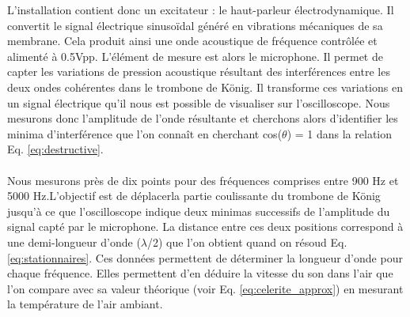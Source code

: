 L'installation contient donc un excitateur : le haut-parleur électrodynamique. Il convertit le signal électrique sinusoïdal généré en vibrations mécaniques de sa membrane. Cela produit ainsi une onde acoustique de fréquence contrôlée et alimenté à 0.5Vpp. L'élément de mesure est alors le microphone. Il permet de capter les variations de pression acoustique résultant des interférences entre les deux ondes cohérentes dans le trombone de König. Il transforme ces variations en un signal électrique qu'il nous est possible de visualiser sur l’oscilloscope. Nous mesurons donc l’amplitude de l’onde résultante et cherchons alors d’identifier les minima d’interférence que l'on connaît en cherchant cos($\theta$) = 1 dans la relation Eq. \ref{eq:destructive}.  \\\\
Nous mesurons près de dix points pour des fréquences comprises entre 900 Hz et 5000 Hz.L'objectif est de déplacerla partie coulissante du trombone de König jusqu’à ce que l’oscilloscope indique deux minimas successifs de l’amplitude du signal capté par le microphone. La distance entre ces deux positions correspond à une demi-longueur d’onde ($\lambda$/2) que l'on obtient quand on résoud Eq. \ref{eq:stationnaires}. Ces données permettent de déterminer la longueur d’onde pour chaque fréquence. Elles permettent d'en déduire la vitesse du son dans l'air que l'on compare avec sa valeur théorique (voir Eq. \ref{eq:celerite_approx}) en mesurant la température de l'air ambiant.
